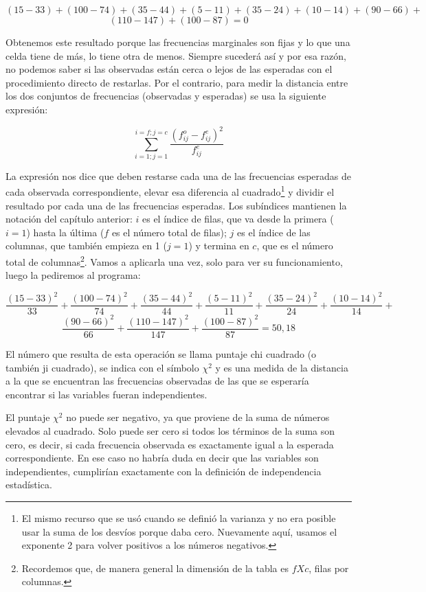 \documentclass[]{book}
\let\rmarkdownfootnote\footnote%
\def\footnote{\protect\rmarkdownfootnote}
\begin{document}
\[(15 - 33) + (100 - 74) + (35 - 44) + (5 - 11) + (35 - 24) + (10 - 14) + (90 - 66) +\]
\[(110 - 147) + (100 - 87) = 0\]

Obtenemos este resultado porque las frecuencias marginales son fijas y lo que una celda tiene de más, lo tiene otra de menos. Siempre sucederá así y por esa razón, no podemos saber si las observadas están cerca o lejos de las esperadas con el procedimiento directo de restarlas. Por el contrario, para medir la distancia entre los dos conjuntos de frecuencias (observadas y esperadas) se usa la siguiente expresión:

\[\sum_{i=1; j=1}^{i=f; j=c}{\frac{(f_{ij}^o - f_{ij}^e)^2}{f_{ij}^e}}\]

La expresión nos dice que deben restarse cada una de las frecuencias esperadas de cada observada correspondiente, elevar esa diferencia al cuadrado\footnote{El mismo recurso que se usó cuando se definió la varianza y no era posible usar la suma de los desvíos porque daba cero. Nuevamente aquí, usamos el exponente 2 para volver positivos a los números negativos.} y dividir el resultado por cada una de las frecuencias esperadas. Los subíndices mantienen la notación del capítulo anterior: \(i\) es el índice de filas, que va desde la primera (\(i=1\)) hasta la última (\(f\) es el número total de filas); \(j\) es el índice de las columnas, que también empieza en 1 (\(j=1\)) y termina en \(c\), que es el número total de columnas\footnote{Recordemos que, de manera general la dimensión de la tabla es \(f X c\), filas por columnas.}. Vamos a aplicarla una vez, solo para ver su funcionamiento, luego la pediremos al programa:

\[\frac{(15 - 33)^{2}}{33} +\frac{(100 - 74)^{2}}{74} + \frac{(35 - 44)^{2}}{44} + \frac{(5 - 11)^{2}}{11} + \frac{(35 - 24)^{2}}{24} + \frac{(10 - 14)^{2}}{14} +\]
\[\frac{(90 - 66)^{2}}{66} +  \frac{(110 - 147)^{2}}{147} + \frac{(100 - 87)^{2}}{87}   = 50,18\]

El número que resulta de esta operación se llama puntaje chi cuadrado (o también ji cuadrado), se indica con el símbolo \(\chi^{2}\) y es una
medida de la distancia a la que se encuentran las frecuencias observadas de las que se esperaría encontrar si las variables fueran
independientes.

El puntaje \(\chi^{2}\) no puede ser negativo, ya que proviene de la suma de números elevados al cuadrado. Solo puede ser cero si todos los términos de la suma son cero, es decir, si cada frecuencia observada es exactamente igual a la esperada correspondiente. En ese caso no habría duda en decir que las variables son independientes, cumplirían exactamente con la definición de independencia estadística.
\end{document}
